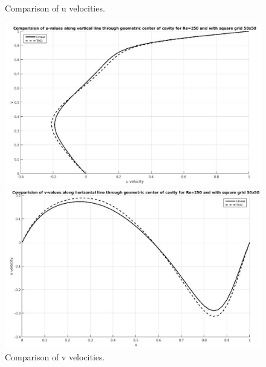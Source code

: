 \documentclass[12pt]{elsarticle}
\begin{document}
	
	\begin{figure}[h]
		\caption{Comparison of u velocities.}
		\centering\includegraphics[width=1.0\linewidth]{21_uvalues_tvd_linear_re_250_50_50}
		\caption{Comparison of v velocities.}
		\centering\includegraphics[width=1.0\linewidth]{22_vvalues_tvd_linear_re_250_50_50}
	\end{figure}
	
\end{document}
